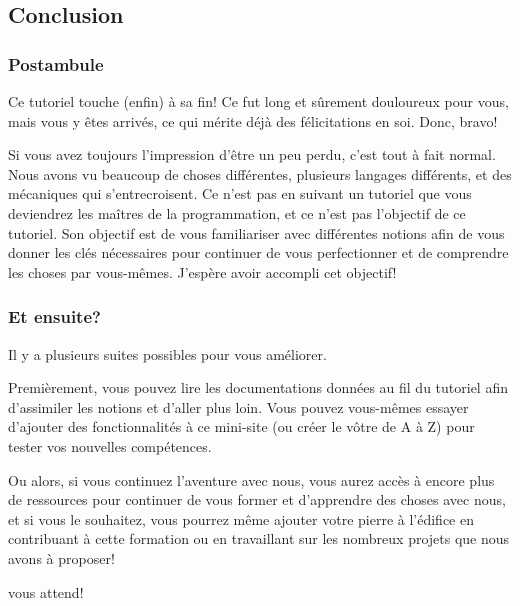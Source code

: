 \subsection{Conclusion}

\subsubsection[Postambule]{Postambule}

Ce tutoriel touche (enfin) à sa fin! Ce fut long et sûrement douloureux pour vous, mais vous y êtes arrivés, ce qui mérite déjà des félicitations en soi. Donc, bravo!

Si vous avez toujours l'impression d'être un peu perdu, c'est tout à fait normal. Nous avons vu beaucoup de choses différentes, plusieurs langages différents, et des mécaniques qui s'entrecroisent. Ce n'est pas en suivant un tutoriel que vous deviendrez les maîtres de la programmation, et ce n'est pas l'objectif de ce tutoriel. Son objectif est de vous familiariser avec différentes notions afin de vous donner les clés nécessaires pour continuer de vous perfectionner et de comprendre les choses par vous-mêmes. J'espère avoir accompli cet objectif!

\subsubsection[Et ensuite?]{Et ensuite?}

Il y a plusieurs suites possibles pour vous améliorer. 

Premièrement, vous pouvez lire les documentations données au fil du tutoriel afin d'assimiler les notions et d'aller plus loin. Vous pouvez vous-mêmes essayer d'ajouter des fonctionnalités à ce mini-site (ou créer le vôtre de A à Z) pour tester vos nouvelles compétences.

Ou alors, si vous continuez l'aventure \nhitec{} avec nous, vous aurez accès à encore plus de ressources pour continuer de vous former et d'apprendre des choses avec nous, et si vous le souhaitez, vous pourrez même ajouter votre pierre à l'édifice en contribuant à cette formation ou en travaillant sur les nombreux projets que nous avons à proposer!

\nhitec{} vous attend!